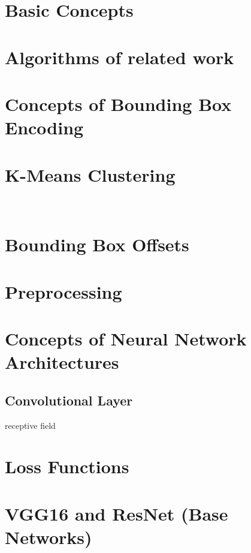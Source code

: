 \section{Basic Concepts}
\blindtext[1]

\section{Algorithms of related work}
\blindtext[2]

\section{Concepts of Bounding Box Encoding}\label{append:Concepts of Bounding Box Encoding}



\section{K-Means Clustering}\label{append:K-Means Clustering}
~\cite[386-390]{James.2017}
\section{Bounding Box Offsets}
\blindtext[1]

\section{Preprocessing}
\blindtext[3]

\section{Concepts of Neural Network Architectures}
\subsection{Convolutional Layer}\label{append:Convolutional Layer}
receptive field~\cite[335-345]{IanGoodfellow.2016}
\blindtext[1]
\blindtext[3]

\section{Loss Functions}
\blindtext[2]

\section{VGG16 and ResNet (Base Networks)}
\blindtext[3]


